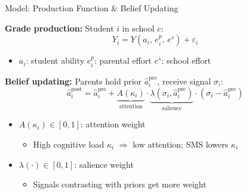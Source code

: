 \documentclass[aspectratio=169,11pt]{beamer}
\begin{document}
\begin{frame}{Model: Production Function \& Belief Updating}

\textbf{Grade production:} Student $i$ in school $e$:
\[
Y_{i} = Y(a_{i},\, e_{i}^{p},\, e^{s}) + \varepsilon_{i}
\]
\begin{itemize}
    \item $a_i$: student ability \quad $e_i^p$: parental effort \quad $e^s$: school effort
\end{itemize}

\bigskip

\textbf{Belief updating:} Parents hold prior $\hat{a}_{i}^{\text{pre}}$, receive signal $\sigma_i$:
\[
\hat{a}_{i}^{\text{post}} = \hat{a}_{i}^{\text{pre}}
  + \underbrace{A(\kappa_i)}_{\text{attention}} \cdot \underbrace{\lambda(\sigma_i, \hat{a}_{i}^{\text{pre}})}_{\text{salience}}
  \cdot (\sigma_i - \hat{a}_{i}^{\text{pre}})
\]

\begin{itemize}
    \item $A(\kappa_i) \in [0,1]$: attention weight \citep{gabaix2014sparsity}
    \begin{itemize}
        \item High cognitive load $\kappa_i$ $\Rightarrow$ low attention; SMS lowers $\kappa_i$
    \end{itemize}
    \item $\lambda(\cdot) \in [0,1]$: salience weight \citep{bordalo2012salience}
    \begin{itemize}
        \item Signals contrasting with priors get more weight
    \end{itemize}
\end{itemize}

\end{frame}

\end{document}
